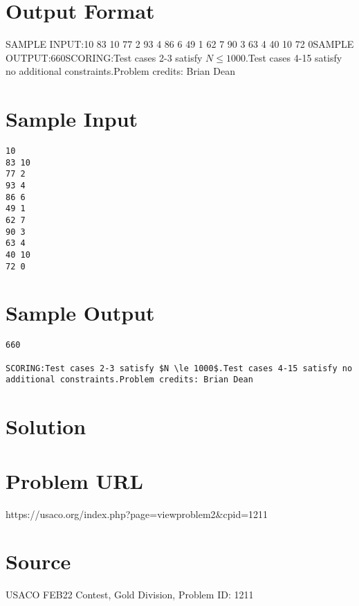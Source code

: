 \documentclass[12pt]{article}
\begin{document}
\section*{Output Format}
SAMPLE INPUT:10
83 10
77 2
93 4
86 6
49 1
62 7
90 3
63 4
40 10
72 0SAMPLE OUTPUT:660SCORING:Test cases 2-3 satisfy $N \le 1000$.Test cases 4-15 satisfy no additional constraints.Problem credits: Brian Dean

\section*{Sample Input}
\begin{verbatim}
10
83 10
77 2
93 4
86 6
49 1
62 7
90 3
63 4
40 10
72 0
\end{verbatim}

\section*{Sample Output}
\begin{verbatim}
660

SCORING:Test cases 2-3 satisfy $N \le 1000$.Test cases 4-15 satisfy no additional constraints.Problem credits: Brian Dean
\end{verbatim}

\section*{Solution}


\section*{Problem URL}
https://usaco.org/index.php?page=viewproblem2&cpid=1211

\section*{Source}
USACO FEB22 Contest, Gold Division, Problem ID: 1211
\end{document}

